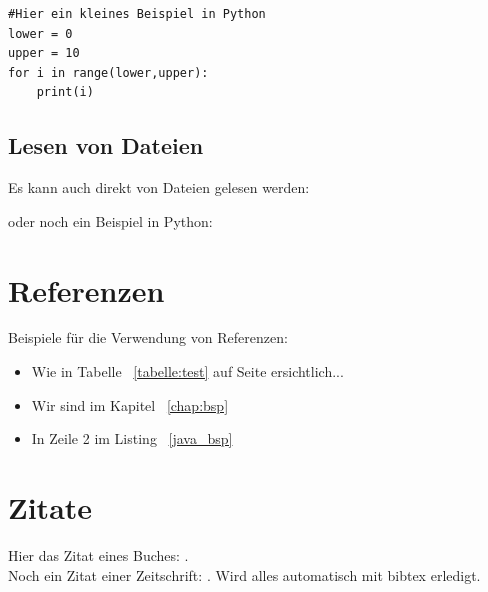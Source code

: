 \begin{lstlisting}[style=Python, caption={Python-Beispiel}, captionpos=b]
#Hier ein kleines Beispiel in Python
lower = 0
upper = 10
for i in range(lower,upper):
	print(i)
\end{lstlisting} 


\subsection{Lesen von Dateien}

Es kann auch direkt von Dateien gelesen werden:



oder noch ein Beispiel in Python:


\section{Referenzen}

Beispiele für die Verwendung von Referenzen: 

\begin{itemize}
	\item Wie in Tabelle ~\ref{tabelle:test} auf Seite \pageref{tabelle:test} ersichtlich... 
	\item Wir sind im Kapitel ~\ref{chap:bsp}
	\item In Zeile 2 im Listing ~\ref{java_bsp} 
\end{itemize}


\section{Zitate}


Hier das Zitat eines Buches: \cite{couper2001}. \\
Noch ein Zitat einer Zeitschrift: \cite{reips2002}. Wird alles automatisch mit bibtex erledigt. 
